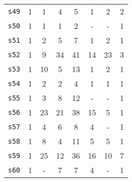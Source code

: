 \begin{longtable}{ l c c c c c c c }
\texttt{s49} & 1 & 1 & 4 & 5 & 1 & 2 & 2 \\
\texttt{s50} & 1 & 1 & 1 & 2 & - & - & 1 \\
\texttt{s51} & 1 & 2 & 5 & 7 & 1 & 2 & 1 \\
\texttt{s52} & 1 & 9 & 34 & 41 & 14 & 23 & 3 \\
\texttt{s53} & 1 & 10 & 5 & 13 & 1 & 2 & 1 \\
\texttt{s54} & 1 & 2 & 2 & 4 & 1 & 1 & 1 \\
\texttt{s55} & 1 & 3 & 8 & 12 & - & - & 1 \\
\texttt{s56} & 1 & 23 & 21 & 38 & 15 & 5 & 1 \\
\texttt{s57} & 1 & 4 & 6 & 8 & 4 & - & 1 \\
\texttt{s58} & 1 & 8 & 4 & 11 & 5 & 5 & 1 \\
\texttt{s59} & 1 & 25 & 12 & 36 & 16 & 10 & 7 \\
\texttt{s60} & 1 & - & 7 & 7 & 4 & - & 1 \\
\end{longtable}
